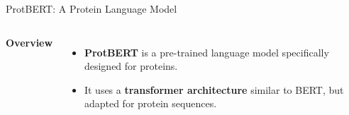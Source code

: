 \begin{frame}{ProtBERT: A Protein Language Model}
    \begin{columns}
        \textbf{Overview}
        \vspace{0.5em}
        \begin{itemize}
            \item<1> \textbf{ProtBERT} is a pre-trained language model specifically designed for proteins.
            \item<2> It uses a \textbf{transformer architecture} similar to BERT, but adapted for protein sequences.
        \end{itemize}
        
        \begin{center}
            \vspace{1em}

\end{center}
\end{columns}
\end{frame}
